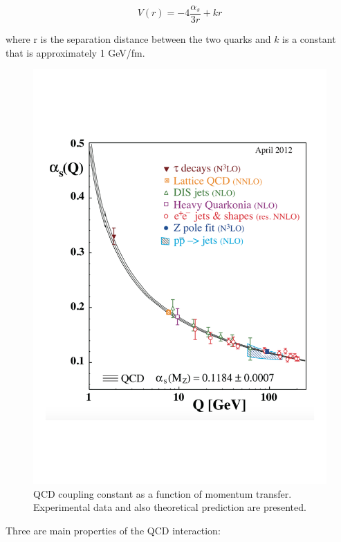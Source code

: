 \begin{equation}\label{label:potential}
V(r) = -4\frac{\alpha_{s}}{3r} + kr
\end{equation}

where r is the separation distance between the two quarks and $k$ is a constant that is approximately 1 GeV/fm. %

\begin{figure}[htbp]
\begin{center}
\includegraphics[width=12.cm]{./Version1/FigChapter1/QCD_alpha}
\caption{QCD coupling constant as a function of momentum transfer. Experimental data and also theoretical prediction are presented. \cite{cite:PDG}}
\label{fig:alpha}
\end{center}
\end{figure}

Three are main properties of the QCD interaction: \\

